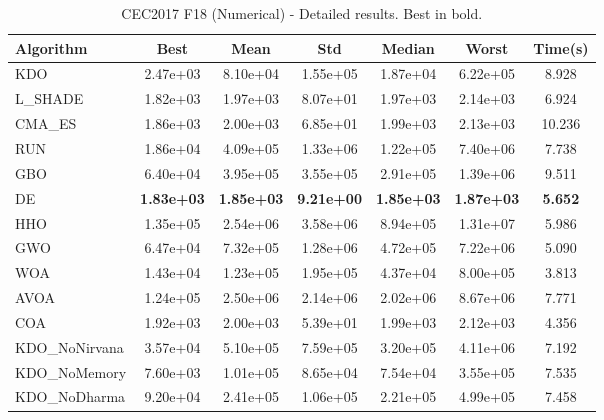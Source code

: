\begin{table}[H]
\centering\small
\caption{CEC2017 F18 (Numerical) - Detailed results. Best in bold.}
\label{tab:cec2017_F18}
\begin{tabular}{lcccccc}
\toprule
\textbf{Algorithm} & \textbf{Best} & \textbf{Mean} & \textbf{Std} & \textbf{Median} & \textbf{Worst} & \textbf{Time(s)} \\
\midrule
KDO & 2.47e+03 & 8.10e+04 & 1.55e+05 & 1.87e+04 & 6.22e+05 & 8.928 \\
L_SHADE & 1.82e+03 & 1.97e+03 & 8.07e+01 & 1.97e+03 & 2.14e+03 & 6.924 \\
CMA_ES & 1.86e+03 & 2.00e+03 & 6.85e+01 & 1.99e+03 & 2.13e+03 & 10.236 \\
RUN & 1.86e+04 & 4.09e+05 & 1.33e+06 & 1.22e+05 & 7.40e+06 & 7.738 \\
GBO & 6.40e+04 & 3.95e+05 & 3.55e+05 & 2.91e+05 & 1.39e+06 & 9.511 \\
DE & \textbf{1.83e+03} & \textbf{1.85e+03} & \textbf{9.21e+00} & \textbf{1.85e+03} & \textbf{1.87e+03} & \textbf{5.652} \\
HHO & 1.35e+05 & 2.54e+06 & 3.58e+06 & 8.94e+05 & 1.31e+07 & 5.986 \\
GWO & 6.47e+04 & 7.32e+05 & 1.28e+06 & 4.72e+05 & 7.22e+06 & 5.090 \\
WOA & 1.43e+04 & 1.23e+05 & 1.95e+05 & 4.37e+04 & 8.00e+05 & 3.813 \\
AVOA & 1.24e+05 & 2.50e+06 & 2.14e+06 & 2.02e+06 & 8.67e+06 & 7.771 \\
COA & 1.92e+03 & 2.00e+03 & 5.39e+01 & 1.99e+03 & 2.12e+03 & 4.356 \\
KDO_NoNirvana & 3.57e+04 & 5.10e+05 & 7.59e+05 & 3.20e+05 & 4.11e+06 & 7.192 \\
KDO_NoMemory & 7.60e+03 & 1.01e+05 & 8.65e+04 & 7.54e+04 & 3.55e+05 & 7.535 \\
KDO_NoDharma & 9.20e+04 & 2.41e+05 & 1.06e+05 & 2.21e+05 & 4.99e+05 & 7.458 \\
\bottomrule
\end{tabular}
\end{table}
